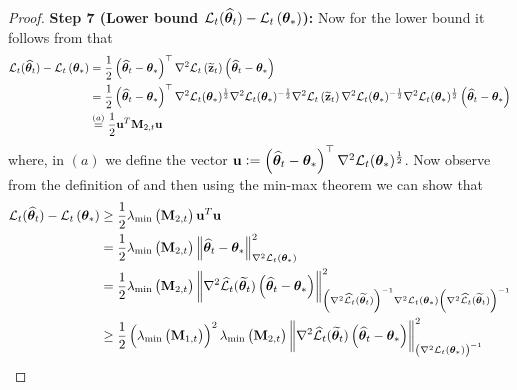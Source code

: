 \begin{proof}
\textbf{Step 7 (Lower bound ${\cal L}_{t}({\widehat{\bm{\theta}}}_{t})-{\cal L}_{t}\left(\bm{\theta}_{*}\right)$):} Now for the lower bound it follows from  that
\begin{align*}
    {\cal L}_{t}({\widehat{\bm{\theta}}}_{t})-{\cal L}_{t}\left(\bm{\theta}_{*}\right) & = \frac{1}{2}\left({\widehat{\bm{\theta}}}_{t}-\bm{\theta}_{*}\right)^{\top} \nabla^{2} {\cal L}_{t}\left(\widetilde{\mathbf{z}}_{t}\right)\left({\widehat{\bm{\theta}}}_{t}-\bm{\theta}_{*}\right)\\
    &= \frac{1}{2}\left({\widehat{\bm{\theta}}}_{t}-\bm{\theta}_{*}\right)^{\top}\nabla^2 {\cal L}_t(\bm{\theta}_*)^{\frac{1}{2}}\nabla^2 {\cal L}_t(\bm{\theta}_*)^{-\frac{1}{2}}\nabla^{2} {\cal L}_{t}\left(\widetilde{\mathbf{z}}_{t}\right)\nabla^2{\cal L}_t(\bm{\theta}_*)^{-\frac{1}{2}} \nabla^2 {\cal L}_t(\bm{\theta}_*)^{\frac{1}{2}}\left({\widehat{\bm{\theta}}}_{t}-\bm{\theta}_{*}\right)\\
    &\overset{(a)}{=} \frac{1}{2} \mathbf{u}^T \mathbf{M}_{2,t} \mathbf{u}
\end{align*}
where, in $(a)$ we define the vector $\mathbf{u} := \left({\widehat{\bm{\theta}}}_{t}-\bm{\theta}_{*}\right)^{\top}\nabla^2 {\cal L}_t(\bm{\theta}_*)^{\frac{1}{2}}$. Now observe from the definition of and then using the min-max theorem we can show that
\begin{align*}
\Lcal_{t}(\twtheta_{t})-\Lcal_{t}\left(\btheta_{*}\right) & \geq \frac{1}{2} \lambda_{\min }\left(\bM_{2, t}\right) \mathbf{u}^T\mathbf{u}\\
& = \frac{1}{2} \lambda_{\min }\left(\bM_{2, t}\right)\left\|\twtheta_{t}-\btheta_{*}\right\|_{\nabla^{2} \Lcal_{t}\left(\btheta_{*}\right)}^{2} \\
&\overset{}{=}\frac{1}{2} \lambda_{\min }\left(\bM_{2, t}\right)\left\|\nabla^{2} \wLcal_{t}(\ttheta_{t})\left(\twtheta_{t}-\btheta_{*}\right)\right\|_{\left(\nabla^{2} \wLcal_{t}(\ttheta_{t})\right)^{-1} \nabla^{2} \Lcal_{t}\left(\btheta_{*}\right)\left(\nabla^{2} \wLcal_{t}(\ttheta_{t})\right)^{-1}}^{2} \\
& \geq \frac{1}{2}\left(\lambda_{\min }\left(\bM_{1, t}\right)\right)^{2} \lambda_{\min }\left(\bM_{2, t}\right)\left\|\nabla^{2} \wLcal_{t}(\ttheta_{t})\left(\twtheta_{t}-\btheta_{*}\right)\right\|_{\left(\nabla^{2} \Lcal_{t}\left(\btheta_{*}\right)\right)^{-1}}^{2} \\

\end{align*}
\end{proof}
